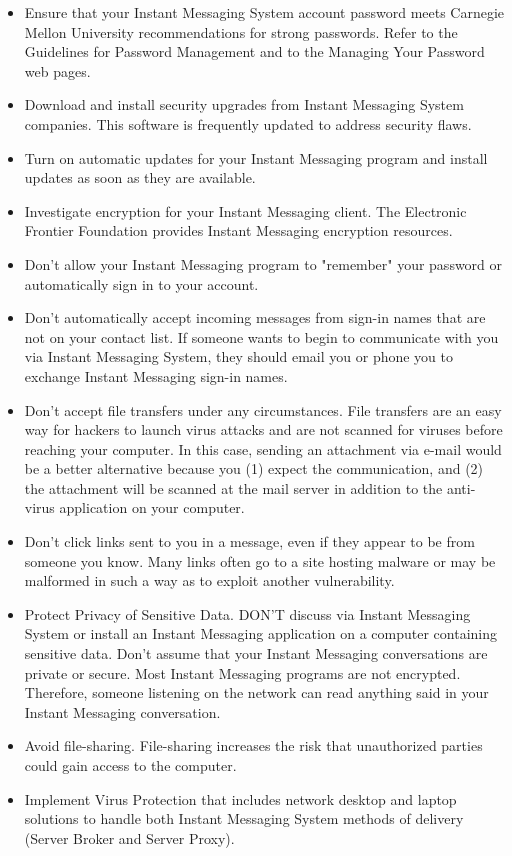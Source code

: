 \begin{itemize}
    \item Ensure that your Instant Messaging System account password meets Carnegie Mellon
    University recommendations for strong passwords.
    Refer to the Guidelines for Password Management and to the Managing Your Password web pages.
    \item Download and install security upgrades from Instant Messaging System companies.
    This software is frequently updated to address security flaws.
    \item Turn on automatic updates for your Instant Messaging program and install updates as soon as they are available.
    \item Investigate encryption for your Instant Messaging client.
    The Electronic Frontier Foundation provides Instant Messaging encryption resources.
    \item Don't allow your Instant Messaging program to "remember" your password or automatically sign in to your account.
    \item Don't automatically accept incoming messages from sign-in names that are not on your contact list.
    If someone wants to begin to communicate with you via Instant Messaging System,
    they should email you or phone you to exchange Instant Messaging sign-in names.
    \item Don't accept file transfers under any circumstances.
    File transfers are an easy way for hackers to launch virus attacks and are not scanned for viruses before reaching your computer.
    In this case, sending an attachment via e-mail would be a better alternative because you (1) expect the communication, and (2)
    the attachment will be scanned at the mail server in addition to the anti-virus application on your computer.
    \item Don't click links sent to you in a message, even if they appear to be from someone you know.
    Many links often go to a site hosting malware or may be malformed in such a way as to exploit another vulnerability.
    \item Protect Privacy of Sensitive Data.
    DON'T discuss via Instant Messaging System or install an Instant Messaging application on a computer containing sensitive data.
    Don't assume that your Instant Messaging conversations are private or secure.
    Most Instant Messaging programs are not encrypted.
    Therefore, someone listening on the network can read anything said in your Instant Messaging conversation.
    \item Avoid file-sharing.
    File-sharing increases the risk that unauthorized parties could gain access to the computer.
    \item Implement Virus Protection that includes network desktop and laptop solutions to handle both Instant Messaging System
    methods of delivery (Server Broker and Server Proxy).
\end{itemize}

